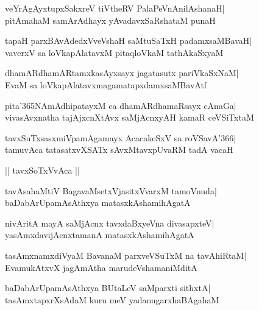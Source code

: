\documentclass[twoside,12pt,openright]{book}
\newcounter{shloka}[chapter]
\begin{document}
\begin{shloka}%
veYrAgAyxtupxSakxreV tiVtheRV PalaPeVnAnilAshanaH|\\
pitAmahaM samArAdhayx yAvadavxSaRshataM punaH
\end{shloka}

\begin{shloka}%
tapaH parxBAvAdedxVveVshaH saMtuSaTxH padamxsaMBavaH|\\
vaverxV sa loVkapAlatavxM pitaqloVkaM tathAkaSxyaM
\end{shloka}

\begin{shloka}%
dhamARdhamARtamxkasAyxsayx jagatasutx pariVkaSxNaM|\\
EvaM sa loVkapAlatavxmagamatapxdamxsaMBavAtf
\end{shloka}

\begin{shloka}%
pita\char'365NAmAdhipatayxM ca dhamARdhamaRsayx cAnaGa|\\
vivasAvxnatha tajAjxcnXtAvx saMjAcnxyAH kamaR ceVSiTxtaM
\end{shloka}

\begin{shloka}%
tavxSuTxsasxmiVpamAgamayx AcacakeSxV sa roVSavA\char'366|\\
tamuvAca tatasatxvXSATx sAvxMtavxpUvaRM tadA vacaH
\end{shloka}

\begin{center}
|| tavxSoTxVvAca ||
\end{center}
\begin{shloka}%
tavAsahaMtiV BagavaMsetxVjasitxVvarxM tamoVnuda|\\
baDabArUpamAsAthxya matasxkAshamihAgatA
\end{shloka}

\begin{shloka}%
nivAritA mayA saMjAcnx tavxdaBxyeVna divasapxteV|\\
yasAmxdavijAcnxtamanA matasxkAshamihAgatA
\end{shloka}

\begin{shloka}%
tasAmxnamxdiVyaM BavanaM parxveVSuTxM na tavAhiRtaM|\\
EvamukAtxvX jagAmAtha marudeVshamaniMditA
\end{shloka}

\begin{shloka}%
baDabArUpamAsAthxya BUtaLeV saMparxti sithxtA|\\
tasAmxtapxrXsAdaM kuru meV yadanugarxhaBAgahaM 
\end{shloka}
\end{document}
